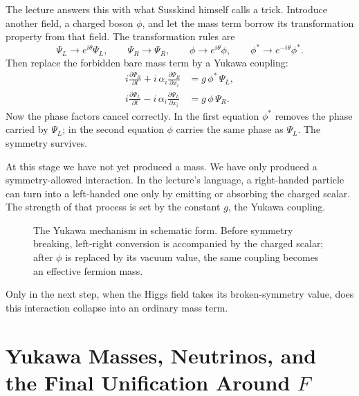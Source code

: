 The lecture answers this with what Susskind himself calls a trick. Introduce another field, a charged boson \(\phi\), and let the mass term borrow its transformation property from that field. The transformation rules are
\begin{equation}
\Psi_L\longrightarrow e^{i\theta}\Psi_L,
\qquad
\Psi_R\longrightarrow \Psi_R,
\qquad
\phi\longrightarrow e^{i\theta}\phi,
\qquad
\phi^*\longrightarrow e^{-i\theta}\phi^*.
\end{equation}
Then replace the forbidden bare mass term by a Yukawa coupling:
\begin{align}
i\frac{\partial \Psi_R}{\partial t}+ i\,\alpha_i\frac{\partial \Psi_R}{\partial x_i} &= g\,\phi^*\,\Psi_L,\\
i\frac{\partial \Psi_L}{\partial t}- i\,\alpha_i\frac{\partial \Psi_L}{\partial x_i} &= g\,\phi\,\Psi_R.
\end{align}
Now the phase factors cancel correctly. In the first equation \(\phi^*\) removes the phase carried by \(\Psi_L\); in the second equation \(\phi\) carries the same phase as \(\Psi_L\). The symmetry survives.

At this stage we have not yet produced a mass. We have only produced a symmetry-allowed interaction. In the lecture's language, a right-handed particle can turn into a left-handed one only by emitting or absorbing the charged scalar. The strength of that process is set by the constant \(g\), the Yukawa coupling.

\begin{figure}[t]
\centering
{}
\caption{The Yukawa mechanism in schematic form. Before symmetry breaking, left-right conversion is accompanied by the charged scalar; after \(\phi\) is replaced by its vacuum value, the same coupling becomes an effective fermion mass.}
\end{figure}

Only in the next step, when the Higgs field takes its broken-symmetry value, does this interaction collapse into an ordinary mass term.

\section{Yukawa Masses, Neutrinos, and the Final Unification Around \(F\)}

